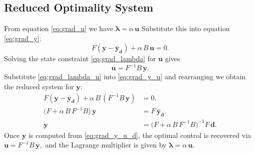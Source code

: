 \subsection*{Reduced Optimality System}
From equation \eqref{eq:grad_u} we have
\(\symbf{\lambda} = \alpha\,\mathbf{u}\)
Substitute this into equation \eqref{eq:grad_y}:
\[
	F(\mathbf{y}-\mathbf{\bar{y}_d}) + \alpha\,B\,\mathbf{u} = 0. \tag{4} \label{eq:grad_y_u}
\]
Solving the state constraint \eqref{eq:grad_lambda} for \(\mathbf{u}\) gives
\[
	\mathbf{u} = F^{-1}B\,\mathbf{y}. \tag{5} \label{eq:grad_lambda_u}
\]
Substitute \eqref{eq:grad_lambda_u} into \eqref{eq:grad_y_u} and rearranging we obtain the reduced system for \(\mathbf{y}\):
\begin{align*}
	F(\mathbf{y}-\mathbf{\bar{y}_d}) + \alpha\,B\,(F^{-1}B\,\mathbf{y}) & = 0.                                                                                  \\
	\bigl(F + \alpha\,B\,F^{-1}B\bigr)\,\mathbf{y}              & = F\,\mathbf{\bar{y}_d}.                                                                      \\
	\mathbf{y}                                                  & = \bigl(F + \alpha\,B\,F^{-1}B\bigr)^{-1}F\,\mathbf{d}. \tag{6} \label{eq:grad_y_u_d}
\end{align*}
Once \(\mathbf{y}\) is computed from \eqref{eq:grad_y_u_d}, the optimal control is recovered via \(\mathbf{u} = F^{-1}B\,\mathbf{y},\)
and the Lagrange multiplier is given by \(\symbf{\lambda} = \alpha\,\mathbf{u}\).
